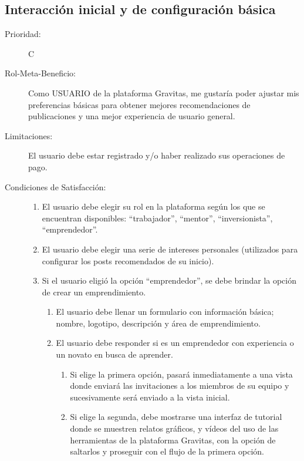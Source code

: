 \newpage    
    
\subsection{Interacción inicial y de configuración básica}

\begin{description}
    \item[Prioridad:] C
    \item[Rol-Meta-Beneficio:]  Como USUARIO de la plataforma Gravitas, me gustaría poder ajustar mis preferencias básicas para obtener mejores recomendaciones de publicaciones y una mejor experiencia de usuario general.
    \item[Limitaciones:]  El usuario debe estar registrado y/o haber realizado sus operaciones de pago.
    \item[Condiciones de Satisfacción:] \hfill
        \begin{enumerate}
            \item El usuario debe elegir su rol en la plataforma según los que se encuentran disponibles: “trabajador”, “mentor”, “inversionista”, “emprendedor”.
            \item El usuario debe elegir una serie de intereses personales (utilizados para configurar los posts recomendados de su inicio).
            \item Si el usuario eligió la opción “emprendedor”, se debe brindar la opción de crear un emprendimiento.
            \begin{enumerate}
                \item El usuario debe llenar un formulario con información básica; nombre, logotipo, descripción y área de emprendimiento.
                \item El usuario debe responder si es un emprendedor con experiencia o un novato en busca de aprender.
                \begin{enumerate}
                    \item Si elige la primera opción, pasará inmediatamente a una vista donde enviará las invitaciones a los miembros de su equipo y sucesivamente será enviado a la vista inicial.
                    \item Si elige la segunda, debe mostrarse una interfaz de tutorial donde se muestren relatos gráficos, y vídeos del uso de las herramientas de la plataforma Gravitas, con la opción de saltarlos y proseguir con el flujo de la primera opción.
                \end{enumerate}

\end{enumerate}
\end{enumerate}
\end{description}
